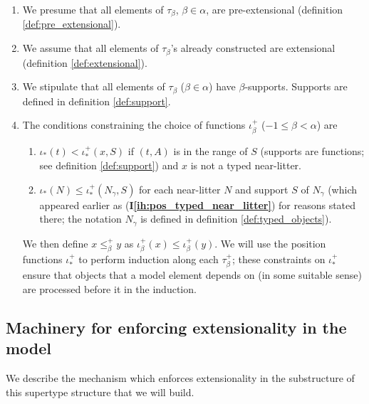 \documentclass[112pt]{article}
\theoremstyle{definition}
\theoremstyle{remark}
\newcommand{\ihref}[1]{(\textbf{I\ref{#1}})}
\begin{document}
\begin{enumerate}
\item \label{ih:pre_extensional} We presume that all elements of $\tau_\beta$, $\beta\in \alpha$, are pre-extensional {(definition \ref{def:pre_extensional})}.   

\item \label{ih:extensional} We assume that all elements of $\tau_\beta$'s already constructed are extensional {(definition \ref{def:extensional})}.  

\item \label{ih:elements_have_supports} We stipulate that all elements of $\tau_\beta$ ($\beta\in\alpha$) have $\beta$-supports.  {Supports are defined in definition \ref{def:support}.}

\item \label{ih:position_constraints} The conditions constraining the choice of functions $\iota^+_\beta$ ($-1 \leq \beta < \alpha$) are

\begin{enumerate}

\item $\iota_*(t) < \iota^+_*(x,S)$ if $(t,A)$ is in the range of $S$ {(supports are functions; see definition \ref{def:support})} and $x$ is not a typed near-litter.  

\item $\iota_*(N) \leq \iota^+_*(N_\gamma,S)$ for each near-litter $N$ and support $S$ of $N_\gamma
$ {(which appeared earlier as \ihref{ih:pos_typed_near_litter} for reasons stated there; the notation $N_\gamma$ is defined in definition \ref{def:typed_objects}).}  

\end{enumerate}

We then define $x \leq^+_\beta y$ as $\iota^+_\beta(x) \leq \iota^+_\beta(y)$.  {We will use the position functions $\iota^+_*$ to perform induction along each $\tau_\beta^+$; these constraints on $\iota^+_*$ ensure that objects that a model element depends on (in some suitable sense) are processed before it in the induction.}

\end{enumerate}


\subsection{Machinery for enforcing extensionality in the model}\label{ss:extensionality_machinery}
  We describe the mechanism which enforces extensionality in the substructure of this supertype structure that we will build.
\end{document}
